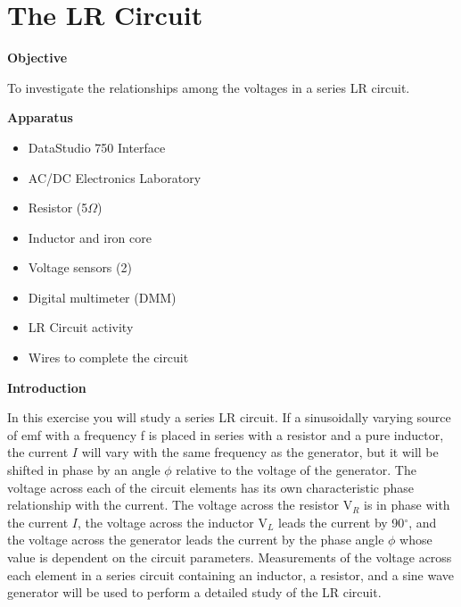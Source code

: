 
\section{The LR Circuit}

\makelabheader %

\textbf{Objective} 

To investigate the relationships among the voltages in a series LR
circuit.

\textbf{Apparatus} 

\begin{itemize}
\item DataStudio 750 Interface
\item AC/DC Electronics Laboratory
\item Resistor (5$\Omega$)
\item Inductor and iron core 
\item Voltage sensors (2)
\item Digital multimeter (DMM)
\item LR Circuit activity
\item Wires to complete the circuit
\end{itemize}
\textbf{Introduction} 

In this exercise you will study a series LR circuit. If a sinusoidally
varying source of emf with a frequency f is placed in series with
a resistor and a pure inductor, the current $I$ will vary with the same
frequency as the generator, but it will be shifted in phase by an
angle \( \phi  \) relative to the voltage of the generator. The voltage
across each of the circuit elements has its own characteristic phase
relationship with the current. The voltage across the resistor V\( _{R} \)
is in phase with the current $I$, the voltage across the inductor V\( _{L} \)
leads the current by 90\( ^{\circ } \), and the voltage across the
generator leads the current by the phase angle \( \phi  \) whose
value is dependent on the circuit parameters. Measurements of the
voltage across each element in a series circuit containing an inductor,
a resistor, and a sine wave generator will be used to perform a detailed
study of the LR circuit.

\vspace{0.3cm}
{\centering {} \par}
\vspace{0.3cm}


